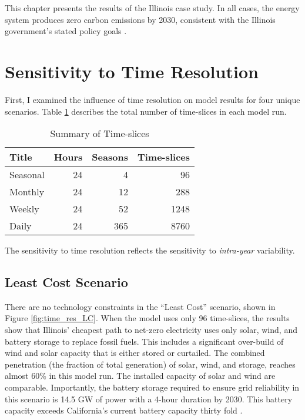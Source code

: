 This chapter presents the results of the Illinois case study. In all cases, the
energy system produces zero carbon emissions by 2030, consistent with the Illinois
government's stated policy goals
\cite{harmon_climate_2021,office_of_governor_jb_pritzker_gov_2021}.
\section{Sensitivity to Time Resolution}
\label{section:time_res}

First, I examined the influence of time resolution on model results for four
unique scenarios. Table \ref{tab:time-slices} describes the total number of
time-slices in each model run.

\begin{table}[H]
  \centering
  \caption{Summary of Time-slices}
  \label{tab:time-slices}
  \begin{tabular}{lrrr}
    \toprule
    Title & Hours & Seasons & Time-slices \\
    \midrule
    Seasonal & 24 & 4 & 96\\
    Monthly & 24 & 12 & 288\\
    Weekly & 24 & 52 & 1248\\
    Daily & 24 & 365 & 8760\\
    \bottomrule
  \end{tabular}
\end{table}
The sensitivity to time resolution reflects the sensitivity to \textit{intra-year}
variability.

\subsection{Least Cost Scenario}

There are no technology constraints in the ``Least Cost'' scenario, shown in Figure \ref{fig:time_res_LC}. When the model uses only 96 time-slices,
the results show that Illinois' cheapest path to net-zero electricity uses
only solar, wind, and battery storage to replace fossil fuels. This includes
a significant over-build of wind and solar capacity that is either stored
or curtailed. The combined penetration (the fraction of total generation)
of solar, wind, and storage, reaches almost 60\% in this model run. The installed
capacity of solar and wind are comparable. Importantly, the battery storage
required to ensure grid reliability in this scenario is 14.5 GW of power with
a 4-hour duration by 2030. This battery capacity exceeds California's current
battery capacity thirty fold \cite{hutchins_us_2021}.

